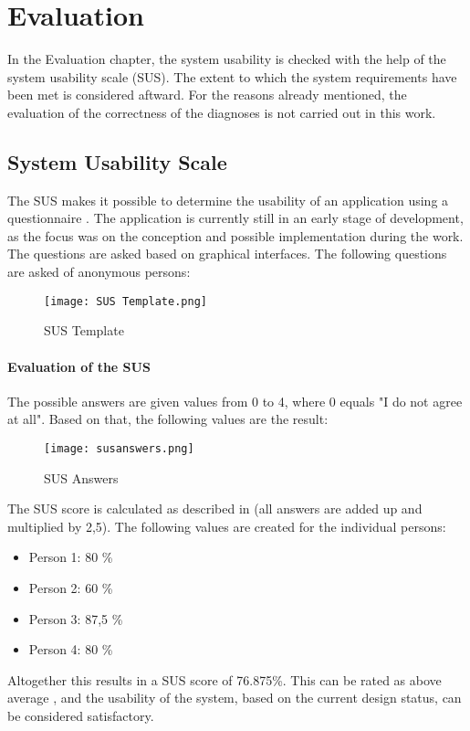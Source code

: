 
\chapter{Evaluation}
In the Evaluation chapter, the system usability is checked with the help of the system usability scale (SUS). The extent to which the system requirements have been met is considered aftward. For the reasons already mentioned, the evaluation of the correctness of the diagnoses is not carried out in this work.

\section{System Usability Scale}
The SUS makes it possible to determine the usability of an application using a questionnaire \cite{.sus}. The application is currently still in an early stage of development, as the focus was on the conception and possible implementation during the work. The questions are asked based on graphical interfaces. The following questions  \cite{.sus} are asked of anonymous persons:
\begin{figure}[H]
	\centering
	\texttt{[image: SUS Template.png]}
	\caption{SUS Template}
\end{figure}
\subsubsection{Evaluation of the SUS}
The possible answers are given values from 0 to 4, where 0 equals "I do not agree at all". Based on that, the following values are the result:
\begin{figure}[H]
	\centering
	\texttt{[image: susanswers.png]}
	\caption{SUS Answers}
\end{figure}
\noindent
The SUS score is calculated as described in \cite{.sus} (all answers are added up and multiplied by 2,5). The following values are created for the individual persons:
\begin{itemize}
	\item Person 1: 80 \%
	\item Person 2: 60 \%
	\item Person 3: 87,5 \%
	\item Person 4: 80 \%
\end{itemize}
Altogether this results in a SUS score of 76.875\%. This can be rated as above average \cite{.sus}, and the usability of the system, based on the current design status, can be considered satisfactory.
